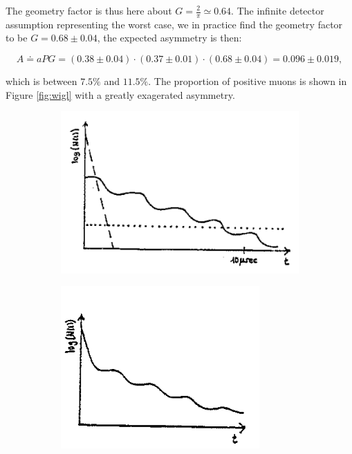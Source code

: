 \begin{enumerate}
The geometry factor is thus here about $G=\frac{2}{\pi}\simeq 0.64$. The infinite detector assumption representing the worst case, we in practice find the geometry factor to be $G=0.68\pm0.04$, the expected asymmetry is then:

\begin{equation}
A \doteq aPG = (0.38 \pm 0.04) \cdot (0.37\pm 0.01) \cdot (0.68 \pm 0.04) = 0.096 \pm 0.019,
\end{equation}

which is between $7.5\%$ and $11.5\%$. The proportion of positive muons is shown in Figure \ref{fig:wigl} with a greatly exagerated asymmetry.

\begin{figure}
\centering
   \begin{subfigure}[t]{0.49\linewidth}
  \centering
   \includegraphics[width=\linewidth]{./fig/wigl1.png}
  \caption{}
\label{sfig:wigl1}
  \end{subfigure}
   \begin{subfigure}[t]{0.49\linewidth}
  \centering
   \includegraphics[width=\linewidth]{./fig/wigl2.png}

\end{subfigure}
\end{figure}
\end{enumerate}
